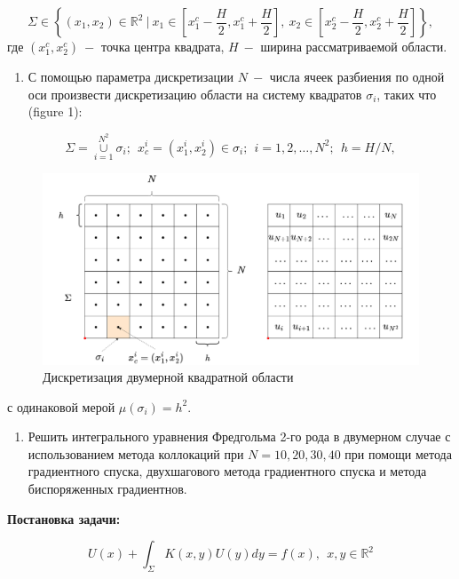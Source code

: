 \documentclass[
]{article}
\providecommand{\tightlist}{%
  \setlength{\itemsep}{0pt}\setlength{\parskip}{0pt}}
\begin{document}
\[
\Sigma \in \left\{(x_1, x_2) \in \mathbb{R}^2\ |\ x_1 \in \left[x^c_1 - \frac{H}{2}, x^c_1 + \frac{H}{2}\right],\ x_2 \in \left[x_2^c - \frac{H}{2}, x^c_2 + \frac{H}{2}\right]\right\},
\] где \((x^c_1, x^c_2)\ -\) точка центра квадрата, \(H\ -\) ширина
рассматриваемой области.

\begin{enumerate}
\def\labelenumi{\arabic{enumi}.}
\setcounter{enumi}{1}
\tightlist
\item
  С помощью параметра дискретизации \(N\ -\) числа ячеек разбиения по
  одной оси произвести дискретизацию области на систему квадратов
  \(\sigma_i\), таких что (figure 1):
\end{enumerate}

\[
\Sigma = \underset{{i=1}}{\overset{N^2}{\cup}} \sigma_i;\ \  x_c^i = (x_1^i, x_2^i) \in \sigma_i;\ \ i = 1,2,\dots, N^2;\ \  h = H / N,
\]

\begin{figure}
\centering
\includegraphics{diplom-Дискретизация двухмерной задачи.drawio(1).png}
\caption{Дискретизация двумерной квадратной области}
\end{figure}

с одинаковой мерой \(\mu(\sigma_i) = h^2\).

\begin{enumerate}
\def\labelenumi{\arabic{enumi}.}
\setcounter{enumi}{2}
\tightlist
\item
  Решить интегрального уравнения Фредгольма 2-го рода в двумерном случае
  с использованием метода коллокаций при \(N = 10, 20, 30, 40\) при
  помощи метода градиентного спуска, двухшагового метода градиентного
  спуска и метода биспоряженных градиентнов.
\end{enumerate}

\textbf{Постановка задачи:}

\[
U(x) + \int_{\Sigma} K(x, y)U(y)dy = f(x), \ \ x,y \in \mathbb{R}^2
\]
\end{document}
